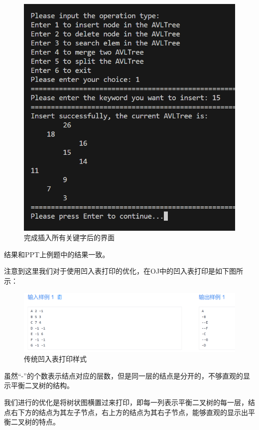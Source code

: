 \begin{figure}[H]
  \centering
  \includegraphics[width=13cm]{fig/AVLTree24.png}
  \caption{完成插入所有关键字后的界面}
\end{figure}

结果和PPT上例题中的结果一致。

注意到这里我们对于使用凹入表打印的优化，在OJ中的凹入表打印是如下图所示：

\begin{figure}[H]
  \centering
  \includegraphics[width=13cm]{fig/AVLTree27.png}
  \caption{传统凹入表打印样式}
\end{figure}

虽然“-”的个数表示结点对应的层数，但是同一层的结点是分开的，不够直观的显示平衡二叉树的结构。

我们进行的优化是将树状图横置过来打印，即每一列表示平衡二叉树的每一层，结点右下方的结点为其左子节点，右上方的结点为其右子节点，能够直观的显示出平衡二叉树的特点。

